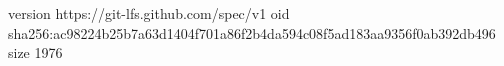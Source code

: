 version https://git-lfs.github.com/spec/v1
oid sha256:ac98224b25b7a63d1404f701a86f2b4da594c08f5ad183aa9356f0ab392db496
size 1976
